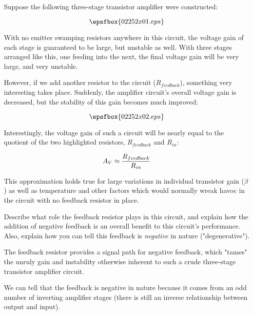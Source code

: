 

Suppose the following three-stage transistor amplifier were constructed:

$$\epsfbox{02252x01.eps}$$

With no emitter swamping resistors anywhere in this circuit, the voltage gain of each stage is guaranteed to be large, but unstable as well.  With three stages arranged like this, one feeding into the next, the final voltage gain will be very large, and very unstable.  

However, if we add another resistor to the circuit ($R_{feedback}$), something very interesting takes place.  Suddenly, the amplifier circuit's overall voltage gain is decreased, but the stability of this gain becomes much improved:

$$\epsfbox{02252x02.eps}$$

Interestingly, the voltage gain of such a circuit will be nearly equal to the quotient of the two highlighted resistors, $R_{feedback}$ and $R_{in}$:

$$A_V \approx {R_{feedback} \over R_{in}}$$

This approximation holds true for large variations in individual transistor gain ($\beta$) as well as temperature and other factors which would normally wreak havoc in the circuit with no feedback resistor in place.  

Describe what role the feedback resistor plays in this circuit, and explain how the addition of negative feedback is an overall benefit to this circuit's performance.  Also, explain how you can tell this feedback is {\it negative} in nature ("degenerative").







The feedback resistor provides a signal path for negative feedback, which "tames" the unruly gain and instability otherwise inherent to such a crude three-stage transistor amplifier circuit.

We can tell that the feedback is negative in nature because it comes from an odd number of inverting amplifier stages (there is still an inverse relationship between output and input).

